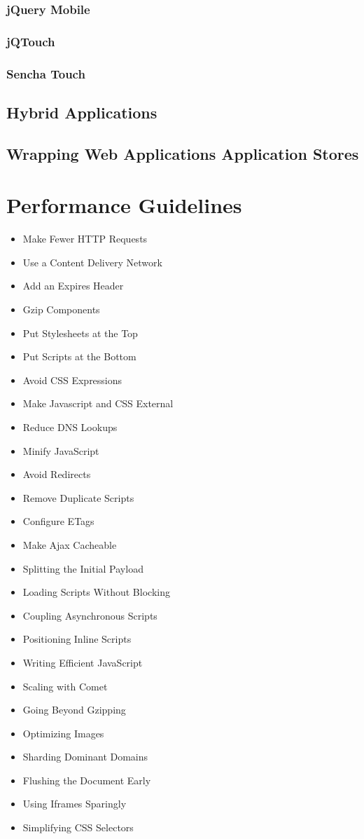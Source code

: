 \subsubsection{jQuery Mobile}
\subsubsection{jQTouch}
\subsubsection{Sencha Touch}

\subsection{Hybrid Applications}
\subsection{Wrapping Web Applications Application Stores}

\section{Performance Guidelines}
\label{section:performance-guidelines}

\begin{itemize}
\item Make Fewer HTTP Requests
\item Use a Content Delivery Network
\item Add an Expires Header
\item Gzip Components
\item Put Stylesheets at the Top
\item Put Scripts at the Bottom
\item Avoid CSS Expressions
\item Make Javascript and CSS External
\item Reduce DNS Lookups
\item Minify JavaScript
\item Avoid Redirects
\item Remove Duplicate Scripts
\item Configure ETags
\item Make Ajax Cacheable
\item Splitting the Initial Payload
\item Loading Scripts Without Blocking
\item Coupling Asynchronous Scripts
\item Positioning Inline Scripts
\item Writing Efficient JavaScript
\item Scaling with Comet
\item Going Beyond Gzipping
\item Optimizing Images
\item Sharding Dominant Domains
\item Flushing the Document Early
\item Using Iframes Sparingly
\item Simplifying CSS Selectors
\end{itemize}
